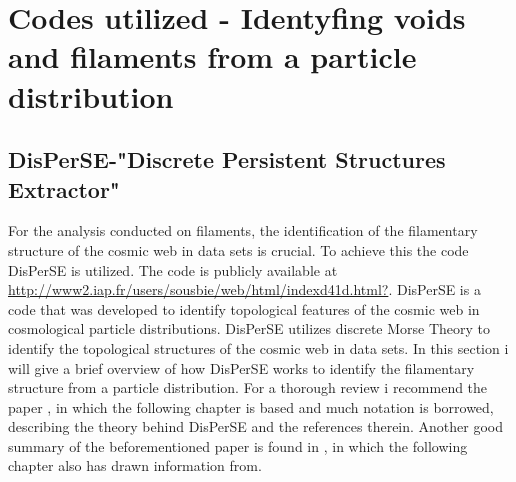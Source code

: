 \chapter{Codes utilized - Identyfing voids and filaments from a particle distribution}\label{sec:codesused}
\section{DisPerSE-"Discrete Persistent Structures Extractor"}
For the analysis conducted on filaments, the identification of the filamentary structure of the cosmic web in
data sets is crucial. To achieve this the code
DisPerSE\cite{2011MNRAS.414..350S}\cite{2011MNRAS.414..384S} is utilized. The
code is publicly available at \url{http://www2.iap.fr/users/sousbie/web/html/indexd41d.html?}.
DisPerSE is a code that was developed to identify topological features of the
cosmic web in cosmological particle distributions. DisPerSE utilizes discrete
Morse Theory to identify the topological structures of the cosmic web in data
sets. In this section i will give a brief overview of how DisPerSE works to
identify the filamentary structure from a particle distribution. For a thorough
review i recommend the paper \cite{2011MNRAS.414..350S}, in which the following
chapter is based and much notation is borrowed, describing the theory behind DisPerSE and the
references therein. Another good summary of the beforementioned paper is found in \cite{Alexhothesis}, in which the following chapter also has drawn information from.
